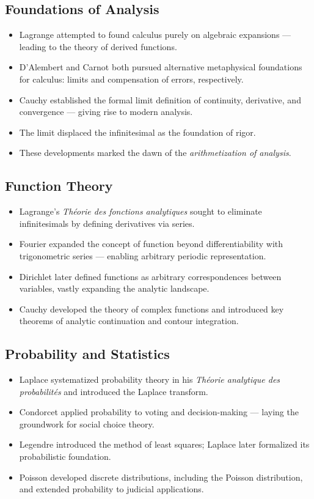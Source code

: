 \documentclass[9pt]{article}
\begin{document}
\subsection*{Foundations of Analysis}
\begin{itemize}
  \item Lagrange attempted to found calculus purely on algebraic expansions — leading to the theory of derived functions.
  \item D’Alembert and Carnot both pursued alternative metaphysical foundations for calculus: limits and compensation of errors, respectively.
  \item Cauchy established the formal limit definition of continuity, derivative, and convergence — giving rise to modern analysis.
  \item The limit displaced the infinitesimal as the foundation of rigor.
  \item These developments marked the dawn of the \textit{arithmetization of analysis}.
\end{itemize}

\subsection*{Function Theory}
\begin{itemize}
  \item Lagrange’s \textit{Théorie des fonctions analytiques} sought to eliminate infinitesimals by defining derivatives via series.
  \item Fourier expanded the concept of function beyond differentiability with trigonometric series — enabling arbitrary periodic representation.
  \item Dirichlet later defined functions as arbitrary correspondences between variables, vastly expanding the analytic landscape.
  \item Cauchy developed the theory of complex functions and introduced key theorems of analytic continuation and contour integration.
\end{itemize}

\subsection*{Probability and Statistics}
\begin{itemize}
  \item Laplace systematized probability theory in his \textit{Théorie analytique des probabilités} and introduced the Laplace transform.
  \item Condorcet applied probability to voting and decision-making — laying the groundwork for social choice theory.
  \item Legendre introduced the method of least squares; Laplace later formalized its probabilistic foundation.
  \item Poisson developed discrete distributions, including the Poisson distribution, and extended probability to judicial applications.
\end{itemize}
\end{document}
